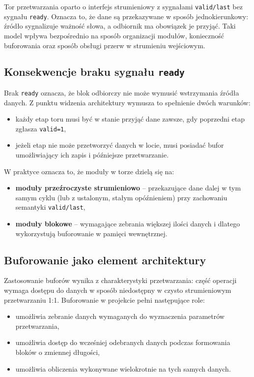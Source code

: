 Tor przetwarzania oparto o interfejs strumieniowy z sygnałami \texttt{valid/last} bez sygnału \texttt{ready}. Oznacza to, że dane są przekazywane w sposób jednokierunkowy: źródło sygnalizuje ważność słowa, a odbiornik ma obowiązek je przyjąć. Taki model wpływa bezpośrednio na sposób organizacji modułów, konieczność buforowania oraz sposób obsługi przerw w strumieniu wejściowym.

\subsection{Konsekwencje braku sygnału \texttt{ready}}
Brak \texttt{ready} oznacza, że blok odbiorczy nie może wymusić wstrzymania źródła danych. Z punktu widzenia architektury wymusza to spełnienie dwóch warunków:
\begin{itemize}
    \item każdy etap toru musi być w stanie przyjąć dane zawsze, gdy poprzedni etap zgłasza \texttt{valid=1},
    \item jeżeli etap nie może przetworzyć danych w locie, musi posiadać bufor umożliwiający ich zapis i późniejsze przetwarzanie.
\end{itemize}

W praktyce oznacza to, że moduły w torze dzielą się na:
\begin{itemize}
    \item \textbf{moduły przeźroczyste strumieniowo} -- przekazujące dane dalej w tym samym cyklu (lub z ustalonym, stałym opóźnieniem) przy zachowaniu semantyki \texttt{valid/last},
    \item \textbf{moduły blokowe} -- wymagające zebrania większej ilości danych i dlatego wykorzystują buforowanie w pamięci wewnętrznej.
\end{itemize}

\subsection{Buforowanie jako element architektury}
Zastosowanie buforów wynika z charakterystyki przetwarzania: część operacji wymaga dostępu do danych w sposób niedostępny w czysto strumieniowym przetwarzaniu 1:1. Buforowanie w projekcie pełni następujące role:
\begin{itemize}
    \item umożliwia zebranie danych wymaganych do wyznaczenia parametrów przetwarzania,
    \item umożliwia dostęp do wcześniej odebranych danych podczas formowania bloków o zmiennej długości,
    \item umożliwia obliczenia wykonywane wielokrotnie na tych samych danych.
\end{itemize}

